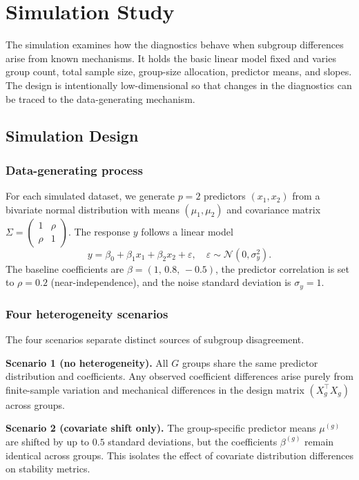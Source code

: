 \section{Simulation Study}\label{sec:simulation}

The simulation examines how the diagnostics behave when subgroup differences arise from known mechanisms. It holds the basic linear model fixed and varies group count, total sample size, group-size allocation, predictor means, and slopes. The design is intentionally low-dimensional so that changes in the diagnostics can be traced to the data-generating mechanism.

\subsection{Simulation Design}

\subsubsection{Data-generating process}

For each simulated dataset, we generate $p=2$ predictors $(x_1, x_2)$ from a bivariate normal distribution with means $(\mu_1, \mu_2)$ and covariance matrix $\Sigma = \begin{pmatrix} 1 & \rho \\ \rho & 1 \end{pmatrix}$. The response $y$ follows a linear model
\[
y = \beta_0 + \beta_1 x_1 + \beta_2 x_2 + \varepsilon, \quad \varepsilon \sim \mathcal{N}(0, \sigma_y^2).
\]
The baseline coefficients are $\beta = (1,\,0.8,\,-0.5)$, the predictor correlation is set to $\rho = 0.2$ (near-independence), and the noise standard deviation is $\sigma_y = 1$.

\subsubsection{Four heterogeneity scenarios}

The four scenarios separate distinct sources of subgroup disagreement.

\textbf{Scenario 1 (no heterogeneity).} All $G$ groups share the same predictor distribution and coefficients. Any observed coefficient differences arise purely from finite-sample variation and mechanical differences in the design matrix $(X_g^\top X_g)$ across groups.

\textbf{Scenario 2 (covariate shift only).} The group-specific predictor means $\mu^{(g)}$ are shifted by up to $0.5$ standard deviations, but the coefficients $\beta^{(g)}$ remain identical across groups. This isolates the effect of covariate distribution differences on stability metrics.

